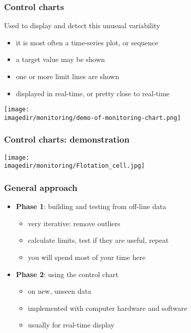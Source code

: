 \begin{frame}\frametitle{Control charts}
	
	Used to display and detect this unusual variability
	\begin{itemize}
		\item	it is most often a time-series plot, or sequence 
		\item	a target value may be shown 
		\item	one or more limit lines are shown 
		\item	displayed in real-time, or pretty close to real-time 
	\end{itemize}
	
	\texttt{[image: \\imagedir/monitoring/demo-of-monitoring-chart.png]}
\end{frame}

\begin{frame}\frametitle{Control charts: demonstration}
	
	\texttt{[image: \\imagedir/monitoring/Flotation\_cell.jpg]}
\end{frame}

\begin{frame}\frametitle{General approach}
	\begin{itemize}
		\item	\textbf{Phase 1}: building and testing from off-line data 
		\begin{itemize}
			\item	very iterative: remove outliers 
			\item	calculate limits, test if they are useful, repeat 
			\item	you will spend most of your time here 
		\end{itemize}
	\end{itemize}
	\begin{itemize}
		\item	\textbf{Phase 2}: using the control chart 
		\begin{itemize}
			\item	on new, unseen data 
			\item	implemented with computer hardware and software 
			\item	usually for real-time display 
		\end{itemize}
	\end{itemize}
\end{frame}

